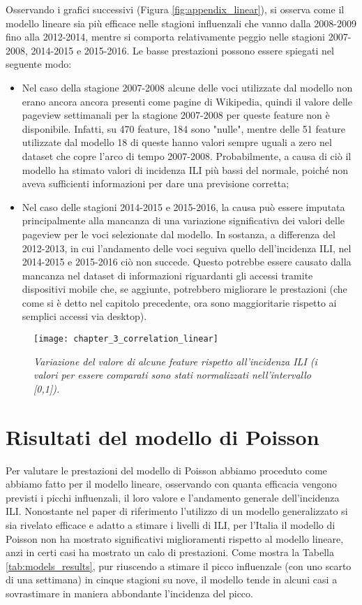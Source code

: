Osservando i grafici successivi (Figura \ref{fig:appendix_linear}), si osserva come il modello lineare sia più efficace 
nelle stagioni influenzali che vanno dalla 2008-2009 fino alla 2012-2014, mentre si comporta relativamente peggio nelle 
stagioni 2007-2008, 2014-2015 e 2015-2016. Le basse prestazioni possono essere spiegati nel seguente modo: 
\begin{itemize}
\item Nel caso della stagione 2007-2008 alcune delle voci utilizzate dal modello non erano ancora ancora presenti come 
pagine di Wikipedia, quindi il valore delle pageview settimanali per la stagione 2007-2008 per queste feature non è 
disponibile. Infatti, su 470 feature, 184 sono "nulle", mentre delle 51 feature utilizzate dal modello 18 di queste hanno 
valori sempre uguali a zero nel dataset che copre l'arco di tempo 2007-2008. Probabilmente, a causa di ciò il modello ha 
stimato valori di incidenza ILI più bassi del normale, poiché non aveva sufficienti informazioni per dare una previsione 
corretta;
\item Nel caso delle stagioni 2014-2015 e 2015-2016, la causa può essere imputata principalmente alla mancanza di una 
variazione significativa dei valori delle pageview per le voci selezionate dal modello. In sostanza, a differenza del 
2012-2013, in cui l'andamento delle voci seguiva quello dell'incidenza ILI, nel 2014-2015 e 2015-2016 ciò non succede. 
Questo potrebbe essere causato dalla mancanza nel dataset di informazioni riguardanti gli accessi tramite dispositivi mobile 
che, se aggiunte, potrebbero migliorare le prestazioni (che come si è detto nel capitolo precedente, ora sono maggioritarie 
rispetto ai semplici accessi via desktop).
\end{itemize}

\begin{figure}[ht]
\texttt{[image: chapter\_3\_correlation\_linear]}
\caption{\textit{Variazione del valore di alcune feature rispetto all'incidenza ILI (i valori per essere comparati sono stati normalizzati nell'intervallo [0,1]).}}
\label{fig:ch_3_correlation_linear}
\centering
\end{figure}

\section{Risultati del modello di Poisson}
\bigskip

Per valutare le prestazioni del modello di Poisson abbiamo proceduto come abbiamo fatto per il modello lineare, osservando 
con quanta efficacia vengono previsti i picchi influenzali, il loro valore e l'andamento generale dell'incidenza ILI. 
Nonostante nel paper di riferimento \cite{McIver2014} l'utilizzo di un modello generalizzato si sia rivelato efficace e 
adatto a stimare i livelli di ILI, per l'Italia il modello di Poisson non ha mostrato significativi miglioramenti rispetto al 
modello lineare, anzi in certi casi ha mostrato un calo di prestazioni. Come mostra la Tabella 
\ref{tab:models_results}, pur riuscendo a stimare il picco influenzale (con uno scarto di una settimana) in cinque 
stagioni su nove, il modello tende in alcuni casi a sovrastimare in maniera abbondante l'incidenza del picco.
\bigskip

